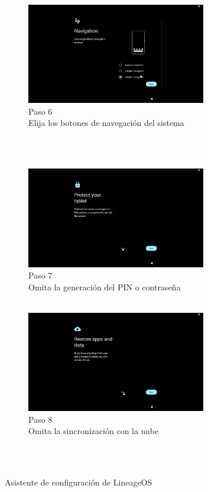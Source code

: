 \documentclass[letterpaper,10.5pt]{article}
\begin{document}
\begin{figure}[H]
\begin{subfigure}[b]{0.48\linewidth}
		\label{fig:setup-wizard-step-5} %
	\end{subfigure}%
	\begin{subfigure}[b]{0.48\linewidth}
		\centering
		\includegraphics[width=0.9\linewidth,height=44mm,keepaspectratio]{img/p02-03-wizard-6.png} %
		\caption{Paso 6\\Elija los botones de navegación del sistema\\~}
		\label{fig:setup-wizard-step-6} %
	\end{subfigure}\\%
	\begin{subfigure}[b]{0.48\linewidth}
		\centering
		\includegraphics[width=0.9\linewidth,height=44mm,keepaspectratio]{img/p02-03-wizard-7.png} %
		\caption{Paso 7\\Omita la generación del PIN o contraseña\\~}
		\label{fig:setup-wizard-step-7} %
	\end{subfigure}%
	\begin{subfigure}[b]{0.48\linewidth}
		\centering
		\includegraphics[width=0.9\linewidth,height=44mm,keepaspectratio]{img/p02-03-wizard-8.png} %
		\caption{Paso 8\\Omita la sincronización con la nube\\~}
		\label{fig:setup-wizard-step-8} %
	\end{subfigure}\\
	\caption{Asistente de configuración de LineageOS}%
	\label{fig:setup-wizard} %
\end{figure}
\end{document}
